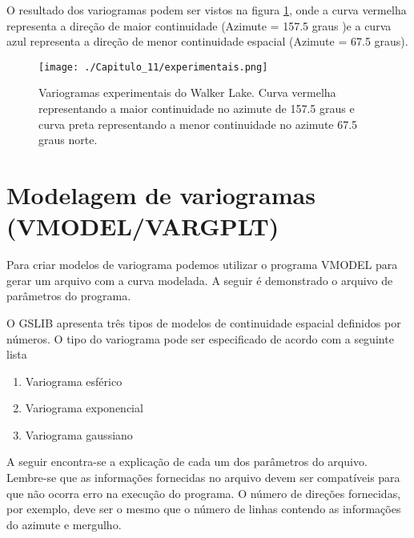 O resultado dos variogramas podem ser vistos na figura \ref{Variograma experimntal}, onde a curva vermelha representa a direção de maior continuidade (Azimute = 157.5 graus )e a curva azul representa a direção de menor continuidade espacial (Azimute = 67.5 graus).

\FloatBarrier
\begin{figure}[h]
	\centering
	\texttt{[image: ./Capitulo\_11/experimentais.png]}	
	\caption{ Variogramas experimentais do Walker Lake. Curva vermelha representando a maior continuidade no azimute de 157.5 graus e curva preta representando a menor continuidade no azimute 67.5 graus norte.}
	\label{Variograma experimntal}
\end{figure}
\FloatBarrier

\section{Modelagem de variogramas (VMODEL/VARGPLT) }

Para criar modelos de variograma podemos utilizar o programa VMODEL para gerar um arquivo com a curva modelada. A seguir é demonstrado o arquivo de parâmetros do programa. 

\begin{small}
	\begingroup
	
	\endgroup
\end{small}

O GSLIB apresenta três tipos de modelos de continuidade espacial definidos por números. O tipo do variograma pode ser especificado de acordo com a seguinte lista

\begin{enumerate}
	\item Variograma esférico 
	\item Variograma exponencial 
	\item Variograma gaussiano 
\end{enumerate}

A seguir encontra-se a explicação de cada um dos parâmetros do arquivo. Lembre-se que as informações fornecidas no arquivo devem ser compatíveis para que não ocorra erro na execução do programa. O número de direções fornecidas, por exemplo, deve ser o mesmo que o número de linhas contendo as informações do azimute e mergulho. 


